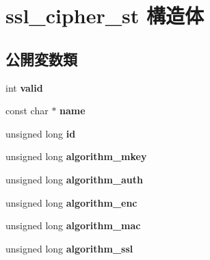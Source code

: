 \hypertarget{structssl__cipher__st}{}\section{ssl\+\_\+cipher\+\_\+st 構造体}
\label{structssl__cipher__st}
\subsection*{公開変数類}
\begin{DoxyCompactItemize}
\item 
\hypertarget{structssl__cipher__st_aaf30c2f1483a5dfcf39a507efb2bacf7}{}int {\bfseries valid}\label{structssl__cipher__st_aaf30c2f1483a5dfcf39a507efb2bacf7}

\item 
\hypertarget{structssl__cipher__st_a860dfffdc51bcbb32da3a3cbae116289}{}const char $\ast$ {\bfseries name}\label{structssl__cipher__st_a860dfffdc51bcbb32da3a3cbae116289}

\item 
\hypertarget{structssl__cipher__st_a65f32a2ae5d5696986ecd0195eb29450}{}unsigned long {\bfseries id}\label{structssl__cipher__st_a65f32a2ae5d5696986ecd0195eb29450}

\item 
\hypertarget{structssl__cipher__st_ab29b842f135c00b0ae7e34fade97893f}{}unsigned long {\bfseries algorithm\+\_\+mkey}\label{structssl__cipher__st_ab29b842f135c00b0ae7e34fade97893f}

\item 
\hypertarget{structssl__cipher__st_a43b013ec206a5c93d2de55b0e2848cf7}{}unsigned long {\bfseries algorithm\+\_\+auth}\label{structssl__cipher__st_a43b013ec206a5c93d2de55b0e2848cf7}

\item 
\hypertarget{structssl__cipher__st_a3c592f9eb460fc02b91ce59485324546}{}unsigned long {\bfseries algorithm\+\_\+enc}\label{structssl__cipher__st_a3c592f9eb460fc02b91ce59485324546}

\item 
\hypertarget{structssl__cipher__st_a6de1434594cf53106b54f0368bfbcf32}{}unsigned long {\bfseries algorithm\+\_\+mac}\label{structssl__cipher__st_a6de1434594cf53106b54f0368bfbcf32}

\item 
\hypertarget{structssl__cipher__st_ae343755fd0c58e74c5e03d41aaccae09}{}unsigned long {\bfseries algorithm\+\_\+ssl}\label{structssl__cipher__st_ae343755fd0c58e74c5e03d41aaccae09}


\end{DoxyCompactItemize}
